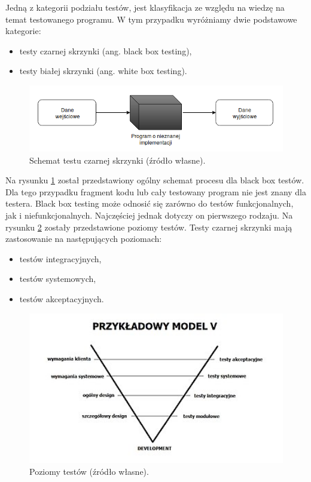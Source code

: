 Jedną z kategorii podziału testów, jest klasyfikacja ze względu na wiedzę na temat testowanego programu.
W tym przypadku wyróżniamy dwie podstawowe kategorie:
\begin{itemize}
\item testy czarnej skrzynki (ang. black box testing),
\item testy białej skrzynki (ang. white box testing).
\end{itemize}

\begin{figure}[h]
    \centering
    \includegraphics[width = 13cm]{chapter01/black-box.png}
    \caption{Schemat testu czarnej skrzynki (źródło własne).}
    \label{fig:black-box}
\end{figure}

Na rysunku \ref{fig:black-box} został przedstawiony ogólny schemat procesu dla black box testów.
Dla tego przypadku fragment kodu lub cały testowany program nie jest znany dla testera.
Black box testing może odnosić się zarówno do testów funkcjonalnych, jak i niefunkcjonalnych.
Najczęściej jednak dotyczy on pierwszego rodzaju.
Na rysunku \ref{fig:tests-levels} zostały przedstawione poziomy testów.
Testy czarnej skrzynki mają zastosowanie na następujących poziomach:
\begin{itemize}
\item testów integracyjnych,
\item testów systemowych,
\item testów akceptacyjnych.
\end{itemize}

\begin{figure}[h]
    \centering
    \includegraphics[width = 13cm]{chapter01/tests_levels.jpg}
    \caption{Poziomy testów (źródło własne).}
    \label{fig:tests-levels}
\end{figure}


